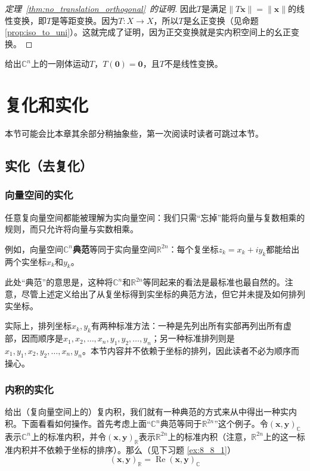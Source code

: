 \begin{proof}[定理~\ref{thm:no_translation_orthogonal}~的证明]
    因此$T$是满足$\|T\mathbf{x}\|=\|\mathbf{x}\|$的线性变换，即$T$是等距变换。因为$T:X\to X$，所以$T$是幺正变换（见命题 \ref{prop:iso_to_uni}）。这就完成了证明，因为正交变换就是实内积空间上的幺正变换。
\end{proof}

\begin{problemset}
    \item 给出$\mathbb{C}^n$上的一刚体运动$T$，$T(\mathbf{0})=\mathbf{0}$，且$T$不是线性变换。
\end{problemset}

\section{复化和实化}

本节可能会比本章其余部分稍抽象些，第一次阅读时读者可跳过本节。

\subsection{实化（去复化）}\label{subsec:decomplexification}

\subsubsection{向量空间的实化}

任意复向量空间都能被理解为实向量空间：我们只需“忘掉”能将向量与复数相乘的规则，而只允许将向量与实数相乘。

例如，向量空间$\mathbb{C}^n$\textbf{典范}等同于实向量空间$\mathbb{R}^{2n}$：每个复坐标$z_k = x_k+iy_k$都能给出两个实坐标$x_k$和$y_k$。

此处“典范”的意思是，这种将$\mathbb{C}^n$和$\mathbb{R}^{2n}$等同起来的看法是最标准也最自然的。注意，尽管上述定义给出了从复坐标得到实坐标的典范方法，但它并未提及如何排列实坐标。

实际上，排列坐标$x_k,y_k$有两种标准方法：一种是先列出所有实部再列出所有虚部，因而顺序是$x_{1},x_{2},\ldots,x_{n},y_{1},y_{2},\ldots,y_{n}$；另一种标准排列则是$x_1,y_1,x_2,y_2,\ldots,x_n,y_n$。本节内容并不依赖于坐标的排列，因此读者不必为顺序而操心。

\subsubsection{内积的实化}

给出（复向量空间上的）复内积，我们就有一种典范的方式来从中得出一种实内积。下面看看如何操作。首先考虑上面“$\mathbb{C}^n$典范等同于$\mathbb{R}^{2n}$”这个例子。令$(\mathbf{x},\mathbf{y})_\mathbb{C}$表示$\mathbb{C}^n$上的标准内积，并令$(\mathbf{x},\mathbf{y})_\mathbb{R}$表示$\mathbb{R}^{2n}$上的标准内积（注意，$\mathbb{R}^{2n}$上的这一标准内积并不依赖于坐标的排序）。那么（见下习题 \ref{ex:8_8_1}）
\begin{equation}\label{canonical_inner_prod}
    (\mathbf{x},\mathbf{y})_\mathbb{R} = \operatorname{Re}(\mathbf{x},\mathbf{y})_\mathbb{C}
\end{equation}

